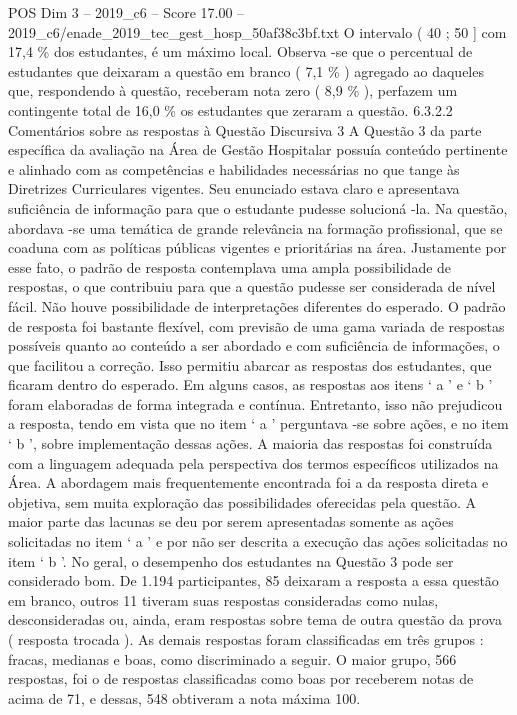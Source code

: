 \begin{textsample}{POS Dim 3 – 2019\_c6 – Score 17.00 – 2019\_c6/enade\_2019\_tec\_gest\_hosp\_50af38c3bf.txt}
O intervalo ( 40 ; 50 ] com 17,4 \% dos estudantes, é um máximo local.
Observa -se que o percentual de estudantes que deixaram a questão em branco ( 7,1 \% ) agregado ao daqueles que, respondendo à questão, receberam nota zero ( 8,9 \% ), perfazem um contingente total de 16,0 \% os estudantes que zeraram a questão. 6.3.2.2 Comentários sobre as respostas à Questão Discursiva 3 A Questão 3 da parte específica da avaliação na Área de Gestão Hospitalar possuía conteúdo pertinente e alinhado com as competências e habilidades necessárias no que tange às Diretrizes Curriculares vigentes.
Seu enunciado estava claro e apresentava suficiência de informação para que o estudante pudesse solucioná -la.
Na questão, abordava -se uma temática de grande relevância na formação profissional, que se coaduna com as políticas públicas vigentes e prioritárias na área.
Justamente por esse fato, o padrão de resposta contemplava uma ampla possibilidade de respostas, o que contribuiu para que a questão pudesse ser considerada de nível fácil.
Não houve possibilidade de interpretações diferentes do esperado.
O padrão de resposta foi bastante flexível, com previsão de uma gama variada de respostas possíveis quanto ao conteúdo a ser abordado e com suficiência de informações, o que facilitou a correção.
Isso permitiu abarcar as respostas dos estudantes, que ficaram dentro do esperado.
Em alguns casos, as respostas aos itens ‘ a ’ e ‘ b ’ foram elaboradas de forma integrada e contínua.
Entretanto, isso não prejudicou a resposta, tendo em vista que no item ‘ a ’ perguntava -se sobre ações, e no item ‘ b ’, sobre implementação dessas ações.
A maioria das respostas foi construída com a linguagem adequada pela perspectiva dos termos específicos utilizados na Área.
A abordagem mais frequentemente encontrada foi a da resposta direta e objetiva, sem muita exploração das possibilidades oferecidas pela questão.
A maior parte das lacunas se deu por serem apresentadas somente as ações solicitadas no item ‘ a ’ e por não ser descrita a execução das ações solicitadas no item ‘ b ’.
No geral, o desempenho dos estudantes na Questão 3 pode ser considerado bom.
De 1.194 participantes, 85 deixaram a resposta a essa questão em branco, outros 11 tiveram suas respostas consideradas como nulas, desconsideradas ou, ainda, eram respostas sobre tema de outra questão da prova ( resposta trocada ).
As demais respostas foram classificadas em três grupos : fracas, medianas e boas, como discriminado a seguir.
O maior grupo, 566 respostas, foi o de respostas classificadas como boas por receberem notas de acima de 71, e dessas, 548 obtiveram a nota máxima 100.

\end{textsample}
